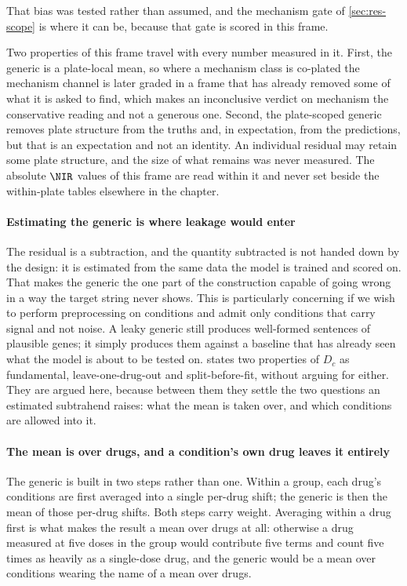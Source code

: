   That bias was tested rather than assumed, and the mechanism gate of
  \cref{sec:res-scope} is where it can be, because that gate is scored in this
  frame.

  \begin{scopelimit}
  Two properties of this frame travel with every number measured in it. First, the
  generic is a plate-local mean, so where a mechanism class is co-plated the
  mechanism channel is later graded in a frame that has already removed some of what
  it is asked to find, which makes an inconclusive verdict on mechanism the
  conservative reading and not a generous one. Second, the plate-scoped generic
  removes plate structure from the truths and, in expectation, from the predictions,
  but that is an expectation and not an identity. An individual residual may retain
  some plate structure, and the size of what remains was never measured. The absolute
  $\NIR$ values of this frame are read within it and never set beside the
  within-plate tables elsewhere in the chapter.
  \end{scopelimit}
  
\paragraph{Estimating the generic is where leakage would enter} The residual is a
subtraction, and the quantity subtracted is not handed down by the design: it is
estimated from the same data the model is trained and scored on. That makes the
generic the one part of the construction capable of going wrong in a way the
target string never shows. This is particularly concerning if we wish to perform preprocessing on conditions and admit only conditions that carry signal and not noise. A leaky generic still produces well-formed sentences of
plausible genes; it simply produces them against a baseline that has already seen
what the model is about to be tested on.  states two
properties of $D_c$ as fundamental, leave-one-drug-out and split-before-fit,
without arguing for either. They are argued here, because between them they settle
the two questions an estimated subtrahend raises: what the mean is taken over, and
which conditions are allowed into it.

\paragraph{The mean is over drugs, and a condition's own drug leaves it entirely}
The generic is built in two steps rather than one. Within a group, each drug's
conditions are first averaged into a single per-drug shift; the generic is then the
mean of those per-drug shifts. Both steps carry weight. Averaging within a drug
first is what makes the result a mean over drugs at all: otherwise a drug measured
at five doses in the group would contribute five terms and count five times as
heavily as a single-dose drug, and the generic would be a mean over conditions
wearing the name of a mean over drugs.

